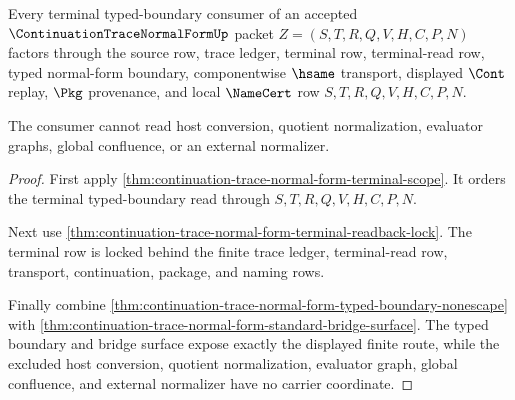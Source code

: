 \begin{theorem}
\label{thm:continuation-trace-normal-form-terminal-typed-boundary-exhaustion}
Every terminal typed-boundary consumer of an accepted $\ContinuationTraceNormalFormUp$ packet $Z=(S,T,R,Q,V,H,C,P,N)$ factors through the source row, trace ledger, terminal row, terminal-read row, typed normal-form boundary, componentwise $\hsame$ transport, displayed $\Cont$ replay, $\Pkg$ provenance, and local $\NameCert$ row $S,T,R,Q,V,H,C,P,N$.

The consumer cannot read host conversion, quotient normalization, evaluator graphs, global confluence, or an external normalizer.
\end{theorem}
\begin{proof}
First apply \autoref{thm:continuation-trace-normal-form-terminal-scope}. It orders the terminal typed-boundary read through $S,T,R,Q,V,H,C,P,N$.

Next use \autoref{thm:continuation-trace-normal-form-terminal-readback-lock}. The terminal row is locked behind the finite trace ledger, terminal-read row, transport, continuation, package, and naming rows.

Finally combine \autoref{thm:continuation-trace-normal-form-typed-boundary-nonescape} with \autoref{thm:continuation-trace-normal-form-standard-bridge-surface}. The typed boundary and bridge surface expose exactly the displayed finite route, while the excluded host conversion, quotient normalization, evaluator graph, global confluence, and external normalizer have no carrier coordinate.
\end{proof}

